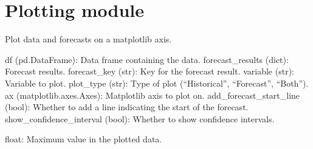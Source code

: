 \documentclass[letterpaper,10pt,english]{sphinxmanual}
\begin{document}
\sphinxstepscope


\section{Plotting module}
\label{\detokenize{Plotting:module-Plotting}}\label{\detokenize{Plotting:plotting-module}}\label{\detokenize{Plotting::doc}}

\begin{fulllineitems}
\label{\detokenize{Plotting:Plotting.plot_data}}
\pysigstartsignatures
{}
\pysigstopsignatures
\sphinxAtStartPar
Plot data and forecasts on a matplotlib axis.
\begin{description}
\sphinxAtStartPar
df (pd.DataFrame): Data frame containing the data.
forecast\_results (dict): Forecast results.
forecast\_key (str): Key for the forecast result.
variable (str): Variable to plot.
plot\_type (str): Type of plot (“Historical”, “Forecast”, “Both”).
ax (matplotlib.axes.Axes): Matplotlib axis to plot on.
add\_forecast\_start\_line (bool): Whether to add a line indicating the start of the forecast.
show\_confidence\_interval (bool): Whether to show confidence intervals.

\sphinxAtStartPar
float: Maximum value in the plotted data.

\end{description}

\end{fulllineitems}

\end{document}
